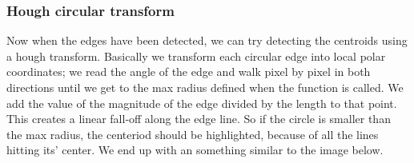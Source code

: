 \subsubsection{Hough circular transform}
Now when the edges have been detected, we can try detecting the centroids using a hough transform. Basically we transform each circular edge into local polar coordinates; we read the angle of the edge and walk pixel by pixel in both directions until we get to the max radius defined when the function is called. We add the value of the magnitude of the edge divided by the length to that point. This creates a linear fall-off along the edge line. So if the circle is smaller than the max radius, the centeriod should be highlighted, because of all the lines hitting its' center. We end up with an something  similar to the image below.

